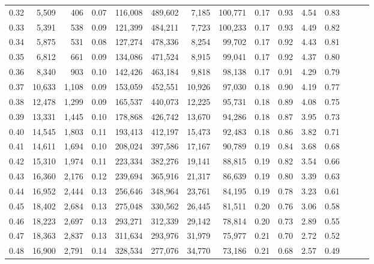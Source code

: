 \begin{tabular}{rrrrrrrrrrrrrrr}
0.32 &   5,509 &    406 &  0.07 &  116,008 &  489,602 &    7,185 &  100,771 &  0.17 &  0.93 &  4.54 &      0.83 \\
0.33 &   5,391 &    538 &  0.09 &  121,399 &  484,211 &    7,723 &  100,233 &  0.17 &  0.93 &  4.49 &      0.82 \\
0.34 &   5,875 &    531 &  0.08 &  127,274 &  478,336 &    8,254 &   99,702 &  0.17 &  0.92 &  4.43 &      0.81 \\
0.35 &   6,812 &    661 &  0.09 &  134,086 &  471,524 &    8,915 &   99,041 &  0.17 &  0.92 &  4.37 &      0.80 \\
0.36 &   8,340 &    903 &  0.10 &  142,426 &  463,184 &    9,818 &   98,138 &  0.17 &  0.91 &  4.29 &      0.79 \\
0.37 &  10,633 &  1,108 &  0.09 &  153,059 &  452,551 &   10,926 &   97,030 &  0.18 &  0.90 &  4.19 &      0.77 \\
0.38 &  12,478 &  1,299 &  0.09 &  165,537 &  440,073 &   12,225 &   95,731 &  0.18 &  0.89 &  4.08 &      0.75 \\
0.39 &  13,331 &  1,445 &  0.10 &  178,868 &  426,742 &   13,670 &   94,286 &  0.18 &  0.87 &  3.95 &      0.73 \\
0.40 &  14,545 &  1,803 &  0.11 &  193,413 &  412,197 &   15,473 &   92,483 &  0.18 &  0.86 &  3.82 &      0.71 \\
0.41 &  14,611 &  1,694 &  0.10 &  208,024 &  397,586 &   17,167 &   90,789 &  0.19 &  0.84 &  3.68 &      0.68 \\
0.42 &  15,310 &  1,974 &  0.11 &  223,334 &  382,276 &   19,141 &   88,815 &  0.19 &  0.82 &  3.54 &      0.66 \\
0.43 &  16,360 &  2,176 &  0.12 &  239,694 &  365,916 &   21,317 &   86,639 &  0.19 &  0.80 &  3.39 &      0.63 \\
0.44 &  16,952 &  2,444 &  0.13 &  256,646 &  348,964 &   23,761 &   84,195 &  0.19 &  0.78 &  3.23 &      0.61 \\
0.45 &  18,402 &  2,684 &  0.13 &  275,048 &  330,562 &   26,445 &   81,511 &  0.20 &  0.76 &  3.06 &      0.58 \\
0.46 &  18,223 &  2,697 &  0.13 &  293,271 &  312,339 &   29,142 &   78,814 &  0.20 &  0.73 &  2.89 &      0.55 \\
0.47 &  18,363 &  2,837 &  0.13 &  311,634 &  293,976 &   31,979 &   75,977 &  0.21 &  0.70 &  2.72 &      0.52 \\
0.48 &  16,900 &  2,791 &  0.14 &  328,534 &  277,076 &   34,770 &   73,186 &  0.21 &  0.68 &  2.57 &      0.49 \\

\end{tabular}
